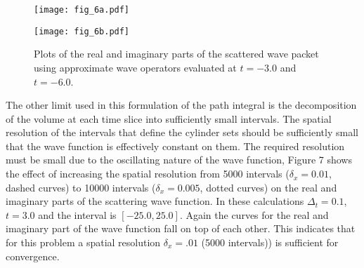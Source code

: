 \documentclass[aps,prc,reprint,noshowpacs,groupedaddress,onecolumn]{revtex4}
\begin{document}
\begin{figure}
\caption{Plots of the real and imaginary parts of the scattered wave packet
using approximate wave operators evaluated at $t=-3.0$ and $t=-6.0$.} 
\begin{minipage}[t]{.45\linewidth}
\centering
\texttt{[image: fig\_6a.pdf]}
\end{minipage}
\begin{minipage}[t]{.45\linewidth}
\centering
\texttt{[image: fig\_6b.pdf]}
\end{minipage}
\label{figure 6}
\end{figure}  

The other limit used in this formulation of the path integral is the
decomposition of the volume at each time slice into sufficiently small
intervals. The
spatial resolution of the intervals that define the cylinder sets
should be sufficiently small that the wave function is effectively
constant on them.  The required resolution must be small 
due to the oscillating nature of the wave function,
Figure 7 shows the effect of increasing the
spatial resolution from 5000 intervals ($\delta_x=0.01$, dashed curves)
to 10000 intervals ($\delta_x=0.005$, dotted curves) on the real and
imaginary parts of the scattering wave function.  In these
calculations $\Delta_t=0.1$, $t=3.0$ and the interval is $[-25.0,25.0]$.
Again the curves for the real and imaginary part of the wave function
fall on top of each other.  This indicates that for this problem a
spatial resolution $\delta_x=.01$ (5000 intervals)) is sufficient for
convergence.
\end{document}
